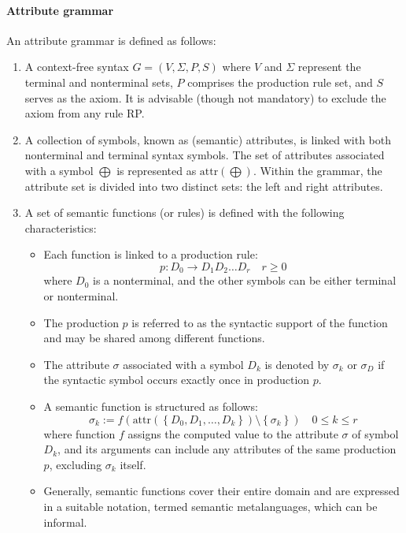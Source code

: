 \paragraph*{Attribute grammar}
An attribute grammar is defined as follows: 
\begin{enumerate}
    \item A context-free syntax $G = \left( V, \Sigma, P, S \right)$ where $V$ and $\Sigma$ represent the terminal and nonterminal sets, $P$ comprises the production rule set, and $S$ serves as the axiom. 
        It is advisable (though not mandatory) to exclude the axiom from any rule RP.
    \item A collection of symbols, known as (semantic) attributes, is linked with both nonterminal and terminal syntax symbols. 
        The set of attributes associated with a symbol $\bigoplus$ is represented as $\text{attr}\left( \bigoplus \right)$.
        Within the grammar, the attribute set is divided into two distinct sets: the left and right attributes.
    \item A set of semantic functions (or rules) is defined with the following characteristics:
        \begin{itemize}
            \item Each function is linked to a production rule:
                  \[ p: D_0 \rightarrow D_1 D_2 \ldots D_r \quad r \geq 0\]
                  where $D_0$ is a nonterminal, and the other symbols can be either terminal or nonterminal.
            \item The production $p$ is referred to as the syntactic support of the function and may be shared among different functions.
            \item The attribute $\sigma$ associated with a symbol $D_k$ is denoted by $\sigma_k$ or $\sigma_D$ if the syntactic symbol occurs exactly once in production $p$.
            \item A semantic function is structured as follows:
                  \[ \sigma_k := f \left( \text{attr} \left( \left\{ D_0, D_1, \ldots , D_k \right\} \right) \setminus \left\{ \sigma_k \right\}\right) \quad 0 \leq k \leq r \]
                  where function $f$ assigns the computed value to the attribute $\sigma$ of symbol $D_k$, and its arguments can include any attributes of the same production $p$, excluding $\sigma_k$ itself.
            \item Generally, semantic functions cover their entire domain and are expressed in a suitable notation, termed semantic metalanguages, which can be informal.

\end{itemize}
\end{enumerate}
